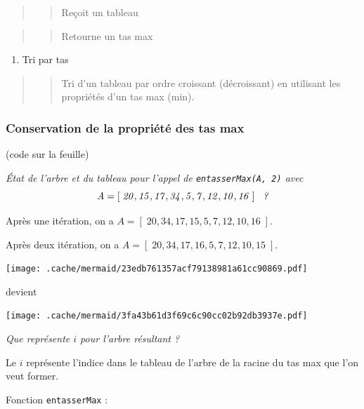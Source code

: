 \begin{quote}
\begin{quote}
Reçoit un tableau
\end{quote}
\end{quote}

\begin{quote}
\begin{quote}
Retourne un tas max
\end{quote}
\end{quote}

\begin{enumerate}
\def\labelenumi{\arabic{enumi}.}
\setcounter{enumi}{2}
\tightlist
\item
  Tri par tas
\end{enumerate}

\begin{quote}
\begin{quote}
Tri d'un tableau par ordre croissant (décroissant) en utilisant les
propriétés d'un tas max (min).
\end{quote}
\end{quote}

\hypertarget{conservation-de-la-propriuxe9tuxe9-des-tas-max}{%
\subsubsection{Conservation de la propriété des tas
max}\label{conservation-de-la-propriuxe9tuxe9-des-tas-max}}

(code sur la feuille)

\emph{État de l'arbre et du tableau pour l'appel de
\texttt{entasserMax(A,\ 2)} avec}
\[\mathit{A = [\;20,15,17,34,5,7,12,10,16\;]\kern3mm \text{\it?}} \]

Après une itération, on a \(A = [\;20,34,17,15,5,7,12,10,16\;]\).

Après deux itération, on a \(A = [\;20,34,17,16,5,7,12,10,15\;]\).

\texttt{[image: .cache/mermaid/23edb761357acf79138981a61cc90869.pdf]}

devient

\texttt{[image: .cache/mermaid/3fa43b61d3f69c6c90cc02b92db3937e.pdf]}

\emph{Que représente \(i\) pour l'arbre résultant ?}

Le \(i\) représente l'indice dans le tableau de l'arbre de la racine du
tas max que l'on veut former.

Fonction \texttt{entasserMax} :

